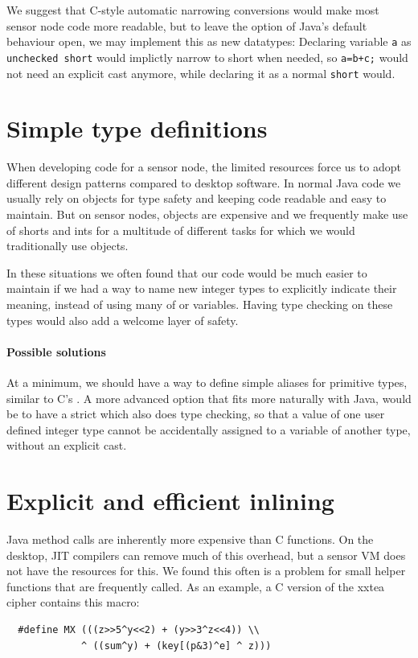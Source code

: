 We suggest that C-style automatic narrowing conversions would make most sensor node code more readable, but to leave the option of Java's default behaviour open, we may implement this as new datatypes: Declaring variable \texttt{a} as \texttt{unchecked short} would implictly narrow to short when needed, so \texttt{a=b+c;} would not need an explicit cast anymore, while declaring it as a normal \texttt{short} would.




\section{Simple type definitions}
\label{sec-typedef}
When developing code for a sensor node, the limited resources force us to adopt different design patterns compared to desktop software. In normal Java code we usually rely on objects for type safety and keeping code readable and easy to maintain. But on sensor nodes, objects are expensive and we frequently make use of shorts and ints for a multitude of different tasks for which we would traditionally use objects.

In these situations we often found that our code would be much easier to maintain if we had a way to name new integer types to explicitly indicate their meaning, instead of using many of  or  variables. Having type checking on these types would also add a welcome layer of safety.

\paragraph{Possible solutions}
At a minimum, we should have a way to define simple aliases for primitive types, similar to C's . A more advanced option that fits more naturally with Java, would be to have a strict  which also does type checking, so that a value of one user defined integer type cannot be accidentally assigned to a variable of another type, without an explicit cast.




\section{Explicit and efficient inlining}
\label{sec-inlining}
Java method calls are inherently more expensive than C functions. On the desktop, JIT compilers can remove much of this overhead, but a sensor VM does not have the resources for this. We found this often is a problem for small helper functions that are frequently called. As an example, a C version of the xxtea cipher \cite{Wheeler:1998} contains this macro: 
\begin{verbatim}
  #define MX (((z>>5^y<<2) + (y>>3^z<<4)) \\
             ^ ((sum^y) + (key[(p&3)^e] ^ z)))
\end{verbatim}

